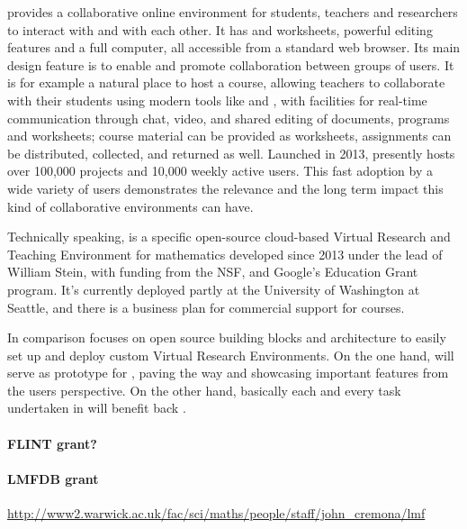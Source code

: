 \SMC provides a collaborative online environment for students,
teachers and researchers to interact with \Sage and with each
other. It has \Sage and \IPython worksheets, powerful \LATEX editing
features and a full \Linux computer, all accessible from a standard
web browser. Its main design feature is to enable and promote
collaboration between groups of users. It is for example a natural
place to host a course, allowing teachers to collaborate with their
students using modern tools like \Sage and \LATEX, with facilities for
real-time communication through chat, video, and shared editing of
documents, programs and worksheets; course material can be provided as
worksheets, assignments can be distributed, collected, and returned as
well. Launched in 2013, \SMC presently hosts over 100,000 projects and
10,000 weekly active users. This fast adoption by a wide variety of
users demonstrates the relevance and the long term impact this kind of
collaborative environments can have.

Technically speaking, \SMC is a specific open-source cloud-based
Virtual Research and Teaching Environment for mathematics developed
since 2013 under the lead of William Stein, with funding from the NSF,
and Google's Education Grant program.
It's currently deployed partly at the University of Washington at
Seattle, and there is a business plan for commercial support for
courses.



In comparison \TheProject focuses on open source building blocks and
architecture to easily set up and deploy custom Virtual Research
Environments. On the one hand, \SMC will serve as prototype for
\TheProject, paving the way and showcasing important features from the
users perspective. On the other hand, basically each and every task
undertaken in \TheProject will benefit back \SMC.

\paragraph{FLINT grant?}

\paragraph{LMFDB grant}\url{http://www2.warwick.ac.uk/fac/sci/maths/people/staff/john_cremona/lmf}

